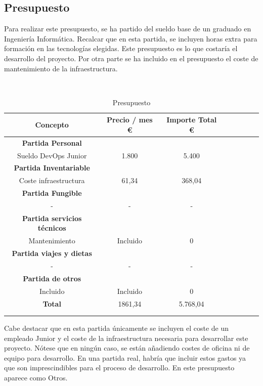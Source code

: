 \subsection{Presupuesto}
	\begin{text}
		Para realizar este presupuesto, se ha partido del sueldo base de un graduado en Ingeniería Informática. Recalcar que en esta partida, se incluyen horas extra para formación en las tecnologías elegidas. Este presupuesto es lo que costaría el desarrollo del proyecto.
		Por otra parte se ha incluido en el presupuesto el coste de mantenimiento de la infraestructura.
	\end{text}
	\\
	\begin{table}[ht]
		\centering
		\begin{tabular}[!hbt]{SSSSSSSS} \toprule
			{Concepto} &  {Precio / mes \euro} & {Importe Total \euro} \\ \midrule
			{\textbf{Partida Personal}} \\ \midrule
			{Sueldo DevOps Junior}  & {1.800} & {5.400}  \\
		    \midrule
			{\textbf{Partida Inventariable}} \\ \midrule
			{Coste infraestructura}  & {61,34}  & {368,04}   \\
			\midrule
			{\textbf{Partida Fungible}} \\ \midrule
			{-}  & {-}  & {-}   \\
			\midrule
			{\textbf{Partida servicios técnicos}} \\ \midrule
			{Mantenimiento}  & {Incluido}  & {0} \\
			\midrule	
			{\textbf{Partida viajes y dietas}} \\ \midrule
			{-}  & {-}  & {-} \\
			\midrule	
			{\textbf{Partida de otros}} \\ \midrule
			{Incluido}  & {Incluido}  & {0} \\
			\midrule	
			{\textbf{Total}}  & {1861,34}  & {5.768,04} \\
			\\ \midrule
		 \\ \bottomrule
		\end{tabular}
		\caption[Presupuesto]{Presupuesto \cite{presupuesto:online}} 
		\label{Presupuesto}
	\end{table}

	\begin{text}
		Cabe destacar que en esta partida únicamente se incluyen el coste de un empleado Junior y el coste de la infraestructura necesaria para desarrollar este proyecto. Nótese que en ningún caso, se están añadiendo costes de oficina ni de equipo para desarrollo. En una partida real, habría que incluir estos gastos ya que son imprescindibles para el proceso de desarrollo. En este presupuesto aparece como Otros.
	\end{text}